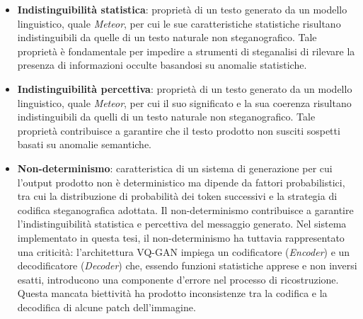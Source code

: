\begin{itemize}
	\item \textbf{Indistinguibilità statistica}: proprietà di un testo generato da un modello linguistico, quale \emph{Meteor}, per cui le sue caratteristiche statistiche risultano indistinguibili da quelle di un testo naturale non steganografico. Tale proprietà è fondamentale per impedire a strumenti di steganalisi di rilevare la presenza di informazioni occulte basandosi su anomalie statistiche.
	\item \textbf{Indistinguibilità percettiva}: propriet\`a di un testo generato da un modello linguistico, quale \emph{Meteor}, per cui il suo significato e la sua coerenza risultano indistinguibili da quelli di un testo naturale non steganografico. Tale propriet\`a contribuisce a garantire che il testo prodotto non susciti sospetti basati su anomalie semantiche.
	\item \textbf{Non-determinismo}: caratteristica di un sistema di generazione per cui l'output prodotto non è deterministico ma dipende da fattori probabilistici, tra cui la distribuzione di probabilit\`a dei token successivi e la strategia di codifica steganografica adottata. Il non-determinismo contribuisce a garantire l'indistinguibilità statistica e percettiva del messaggio generato. Nel sistema implementato in questa tesi, il non-determinismo ha tuttavia rappresentato una criticità: l'architettura VQ-GAN impiega un codificatore (\emph{Encoder}) e un decodificatore (\emph{Decoder}) che, essendo funzioni statistiche apprese e non inversi esatti, introducono una componente d'errore nel processo di ricostruzione. Questa mancata biettività ha prodotto inconsistenze tra la codifica e la decodifica di alcune patch dell'immagine.
\end{itemize}